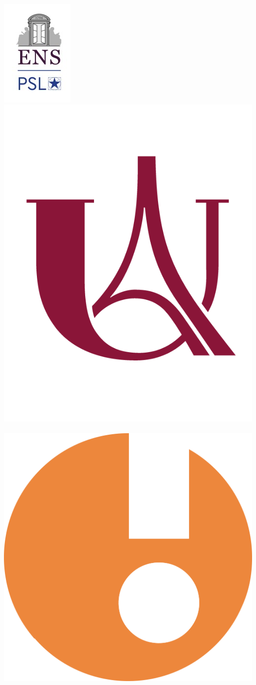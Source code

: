 \documentclass[a0paper,fleqn]{better_poster/betterposter}
\begin{document}
{%
\vfill



\includegraphics[width=0.25 \textwidth]{logos/logo_ens_carre.png} \ \ \includegraphics[width=0.3 \textwidth]{logos/logoUP.png}  \ \ \includegraphics[width=0.3 \textwidth]{logos/logo_Inserm.png}\\
}
\end{document}
